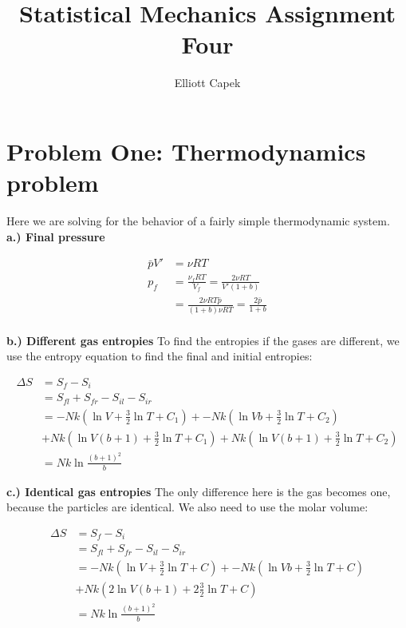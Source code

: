 \documentclass[10pt]{article} %
\title{Statistical Mechanics Assignment Four}
\author{Elliott Capek}
\begin{document}
\maketitle{}

\section{Problem One: Thermodynamics problem}
Here we are solving for the behavior of a fairly simple thermodynamic system.\\

\textbf{a.) Final pressure}

\begin{align*}
  \bar{p}V' &= \nu RT\\
  p_f &= \frac{\nu_f RT}{V_f} = \frac{2\nu RT}{V'(1+b)}\\
  &= \frac{2\nu RT\bar{p}}{(1+b)\nu RT} = \frac{2\bar{p}}{1+b}\\
\end{align*}

\textbf{b.) Different gas entropies}
To find the entropies if the gases are different, we use the entropy equation to find
the final and initial entropies:

\begin{align*}
  \Delta S &= S_f - S_i\\
  &= S_{fl} + S_{fr} - S_{il} - S_{ir}\\
  &= -Nk\left(\ln V + \frac{3}{2}\ln T + C_1\right)
  + -Nk\left(\ln Vb + \frac{3}{2}\ln T + C_2\right)\\
  &+ Nk\left(\ln V(b+1) + \frac{3}{2}\ln T + C_1\right)
  + Nk\left(\ln V(b+1) + \frac{3}{2}\ln T + C_2\right)\\
  &= Nk\ln\frac{(b+1)^2}{b}
\end{align*}

\textbf{c.) Identical gas entropies}
The only difference here is the gas becomes one, because the particles are identical. We
also need to use the molar volume:

\begin{align*}
  \Delta S &= S_f - S_i\\
  &= S_{fl} + S_{fr} - S_{il} - S_{ir}\\
  &= -Nk\left(\ln V + \frac{3}{2}\ln T + C\right)
  + -Nk\left(\ln Vb + \frac{3}{2}\ln T + C\right)\\
  &+ Nk\left(2\ln V(b+1) + 2\frac{3}{2}\ln T + C\right)\\
  &= Nk\ln\frac{(b+1)^2}{b}\\
\end{align*}
\end{document}
